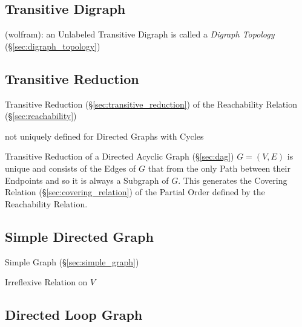 \subsection{Transitive Digraph}\label{sec:transitive_digraph}

(wolfram): an Unlabeled Transitive Digraph is called a \emph{Digraph Topology}
(\S\ref{sec:digraph_topology})



\subsection{Transitive Reduction}
\label{sec:transitive_reduction_graph}

Transitive Reduction (\S\ref{sec:transitive_reduction}) of the
Reachability Relation (\S\ref{sec:reachability})

not uniquely defined for Directed Graphs with Cycles

Transitive Reduction of a Directed Acyclic Graph (\S\ref{sec:dag}) $G
= (V,E)$ is unique and consists of the Edges of $G$ that from the only
Path between their Endpoints and so it is always a Subgraph of $G$.
This generates the Covering Relation (\S\ref{sec:covering_relation})
of the Partial Order defined by the Reachability Relation.



\subsection{Simple Directed Graph}\label{sec:simple_directed}

Simple Graph (\S\ref{sec:simple_graph})

Irreflexive Relation on $V$



\subsection{Directed Loop Graph}\label{sec:directed_loop_graph}

